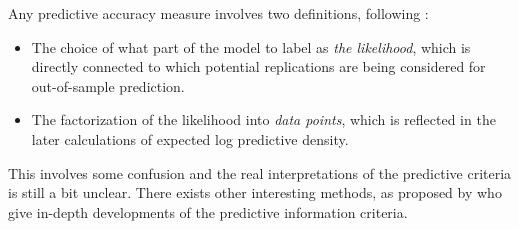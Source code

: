 Any predictive accuracy measure involves
two definitions, following \citet{vehtari_practical_2016}: 
\begin{itemize} 
\item The choice of what part of the model to label as \emph{the likelihood}, which is directly
connected to which potential replications are being considered for out-of-sample prediction.

\item The factorization of the likelihood into \emph{data points}, which is reflected in the later calculations of
expected log predictive density.
\end{itemize}
This involves some confusion and the real interpretations of the predictive criteria is still a bit unclear.
There exists other interesting methods, as proposed by \citet{gelman_understanding_2014} who give in-depth developments of the predictive information criteria.

 




